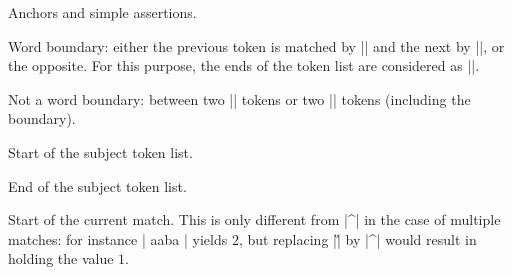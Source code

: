 \documentclass[oneside]{book}
\newenvironment{l3regex-syntax}
  {\begin{itemize}\def\\{\char`\\}\def\makelabel##1{\hss\llap{\ttfamily##1}}}
  {\end{itemize}}
\begin{document}
Anchors and simple assertions.
\begin{l3regex-syntax}
  \item[\\b] Word boundary: either the previous token is matched by
    |\w| and the next by |\W|, or the opposite. For this purpose,
    the ends of the token list are considered as |\W|.
  \item[\\B] Not a word boundary: between two |\w| tokens
    or two |\W| tokens (including the boundary).
  \item[\char`^ \textrm{or} \\A]
    Start of the subject token list.
  \item[\char`$\textrm{,} \\Z \textrm{or} \\z] %
    End of the subject token list.
  \item[\\G] Start of the current match. This is only different from |^|
    in the case of multiple matches: for instance
    | {aaba} \lTmpaInt| yields $2$, but
    replacing |\G| by |^| would result in  holding the
    value $1$.
\end{l3regex-syntax}
\end{document}

